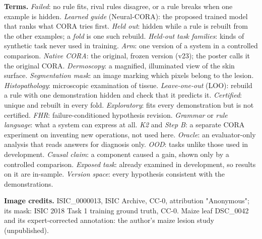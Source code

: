 \documentclass[11pt, a4paper]{article}
\begin{document}
\textbf{Terms.} \emph{Failed}: no rule fits, rival rules disagree, or a rule breaks when one example is hidden. \emph{Learned guide}
(Neural-CORA): the proposed trained model that ranks what CORA tries first. \emph{Held out}: hidden while a rule is
rebuilt from the other examples; a \emph{fold} is one such rebuild. \emph{Held-out task families}: kinds of synthetic task never
used in training. \emph{Arm}: one version of a system in a controlled comparison. \emph{Native CORA}: the original, frozen version
(v23); the poster calls it the original CORA. \emph{Dermoscopy}: a magnified, illuminated view of the skin surface. \emph{Segmentation mask}: an
image marking which pixels belong to the lesion. \emph{Histopathology}: microscopic examination of tissue. \emph{Leave-one-out}
(LOO): rebuild a rule with one demonstration hidden and check that it predicts it. \emph{Certified}: unique and rebuilt in
every fold. \emph{Exploratory}: fits every demonstration but is not certified. \emph{FHR}: failure-conditioned hypothesis
revision. \emph{Grammar} or \emph{rule language}: what a system can express at all. \emph{K2} and \emph{Step B}: a separate CORA experiment
on inventing new operations, not used here. \emph{Oracle}: an evaluator-only analysis that reads answers for diagnosis only.
\emph{OOD}: tasks unlike those used in development. \emph{Causal claim}: a component caused a gain, shown only by a controlled
comparison. \emph{Exposed task}: already examined in development, so results on it are in-sample. \emph{Version space}: every
hypothesis consistent with the demonstrations.

\textbf{Image credits.} ISIC\_0000013, ISIC Archive, CC-0, attribution "Anonymous"; its mask: ISIC 2018 Task 1 training ground
truth, CC-0. Maize leaf DSC\_0042 and its expert-corrected annotation: the author's maize lesion study (unpublished).
\end{document}
